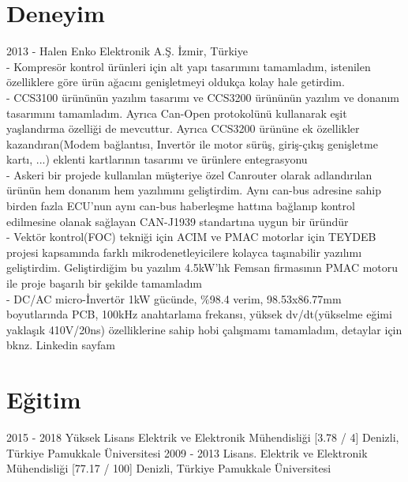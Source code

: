 \documentclass[]{cv-style} %
\begin{document}
\section{Deneyim}
\begin{entrylist}
\entry
  {2013 - Halen}
  {Enko Elektronik A.Ş.}
  {İzmir, Türkiye}
  {\\
- Kompresör kontrol ürünleri için alt yapı tasarımını tamamladım, istenilen özelliklere göre ürün ağacını genişletmeyi oldukça kolay hale getirdim. 
\\- CCS3100 ürününün yazılım tasarımı ve CCS3200 ürününün yazılım ve donanım tasarımını tamamladım. Ayrıca Can-Open protokolünü kullanarak eşit yaşlandırma özelliği de mevcuttur. Ayrıca CCS3200 ürününe ek özellikler kazandıran(Modem bağlantısı, Invertör ile motor sürüş, giriş-çıkış genişletme kartı, ...) eklenti kartlarının tasarımı ve ürünlere entegrasyonu
\\- Askeri bir projede kullanılan müşteriye özel Canrouter olarak adlandırılan ürünün hem donanım hem yazılımını geliştirdim. Aynı can-bus adresine sahip birden fazla ECU'nun aynı can-bus haberleşme hattına bağlanıp kontrol edilmesine olanak sağlayan CAN-J1939 standartına uygun bir üründür
\\- Vektör kontrol(FOC) tekniği için ACIM ve PMAC motorlar için TEYDEB projesi kapsamında farklı mikrodenetleyicilere kolayca taşınabilir yazılımı geliştirdim. Geliştirdiğim bu yazılım 4.5kW'lık Femsan firmasının PMAC motoru ile proje başarılı bir şekilde tamamladım
\\- DC/AC micro-İnvertör 1kW gücünde, $\%$98.4 verim, 98.53x86.77mm boyutlarında PCB, 100kHz anahtarlama frekansı, yüksek dv/dt(yükselme eğimi yaklaşık 410V/20ns) özelliklerine sahip hobi çalışmamı tamamladım, detaylar için bknz. Linkedin sayfam}
\end{entrylist}
\section{Eğitim}
\begin{entrylist}
\entry
{2015 - 2018}
{Yüksek Lisans {\normalfont Elektrik ve Elektronik Mühendisliği [3.78 / 4]}}
{Denizli, Türkiye}
{Pamukkale Üniversitesi}
\entry
{2009 - 2013}
{Lisans. {\normalfont Elektrik ve Elektronik Mühendisliği [77.17 / 100]}}
{Denizli, Türkiye}
{Pamukkale Üniversitesi}
\end{entrylist} 
\end{document}
